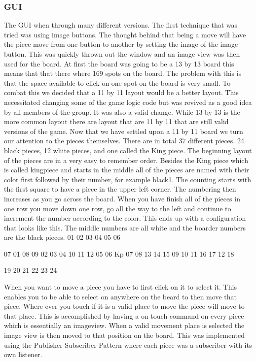 \documentclass{article}
\begin{document}
\subsubsection{GUI}
	The GUI when through many different versions. The first technique that was tried was using image buttons. The thought behind that being a move will have the piece move from one button to another by setting the image of the image button. This was quickly thrown out the window and an image view was then used for the board. At first the board was going to be a 13 by 13 board this means that that there where 169 spots on the board. The problem with this is that the space available to click on one spot on the board is very small. To combat this we decided that a 11 by 11 layout would be a better layout. This necessitated changing some of the game logic code but was revived as a good idea by all members of the group. It was also a valid change. While 13 by 13 is the more common layout there are layout that are 11 by 11 that are still valid versions of the game. 
	Now that we have settled upon a 11 by 11 board we turn our attention to the pieces themselves. There are in total 37 different pieces. 24 black pieces, 12 white pieces, and one called the King piece.  The beginning layout of the pieces are in a very easy to remember order. Besides the King piece which is called kingpiece and starts in the middle all of the pieces are named with their color first followed by their number, for example black1. The counting starts with the first square to have a piece in the upper left corner. The numbering then increases as you go across the board. When you have finish all of the pieces in one row you move down one row, go all the way to the left and continue to increment the number according to the color. This ends up with a configuration that looks like this. The middle numbers are all white and the boarder numbers are the black pieces.
        01 02 03 04 05
              06
      
07            01            08
09         02 03 04         10
11 12   05 06 Kp 07 08   13 14
15         09 10 11         16
17            12            18

              19
        20 21 22 23 24

	When you want to move a piece you have to first click on it to select it. This enables you to be able to select on anywhere on the beard to then move that piece. Where ever you touch if it is a valid place to move the piece will move to that place. This is accomplished by having a on touch command on every piece which is essentially an imageview. When a valid movement place is selected the image view is then moved to that position on the board. This was implemented using the Publisher Subscriber Pattern where each piece was a subscriber with its own listener. 
\end{document}
